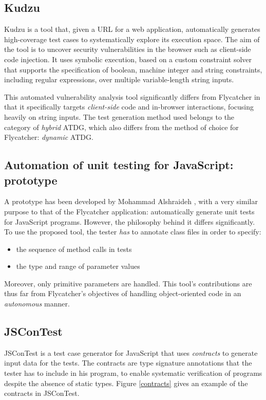 \subsection{Kudzu}
\textsf{Kudzu} \cite{saxena2010symbolic} is a tool that, given a URL for a web application, automatically generates high-coverage test cases to systematically explore its execution space. The aim of the tool is to uncover security vulnerabilities in the browser such as client-side code injection. It uses symbolic execution, based on a custom constraint solver that supports the specification of boolean, machine integer and string constraints, including regular expressions, over multiple variable-length string inputs.

This automated vulnerability analysis tool significantly differs from \textsf{Flycatcher} in that it specifically targets \emph{client-side} code and in-browser interactions, focusing heavily on string inputs. The test generation method used belongs to the category of \emph{hybrid} ATDG, which also differs from the method of choice for \textsf{Flycatcher}: \emph{dynamic} ATDG.

\subsection{Automation of unit testing for JavaScript: prototype}
A prototype has been developed by Mohammad Alshraideh \cite{alshraideh2008complete}, with a very similar purpose to that of the \textsf{Flycatcher} application: automatically generate unit tests for JavaScript programs. However, the philosophy behind it differs significantly. To use the proposed tool, the tester \emph{has} to annotate class files in order to specify:
\begin{itemize}
   \item the sequence of method calls in tests
   \item the type and range of parameter values
\end{itemize}
Moreover, only primitive parameters are handled. This tool's contributions are thus far from \textsf{Flycatcher}'s objectives of handling object-oriented code in an \emph{autonomous} manner.

\subsection{JSConTest}
\textsf{JSConTest} \cite{contract-driven} is a test case generator for JavaScript that uses \emph{contracts} to generate input data for the tests. The contracts are type signature annotations that the tester has to include in his program, to enable systematic verification of programs despite the absence of static types. Figure \ref{contracts} gives an example of the contracts in \textsf{JSConTest}.

